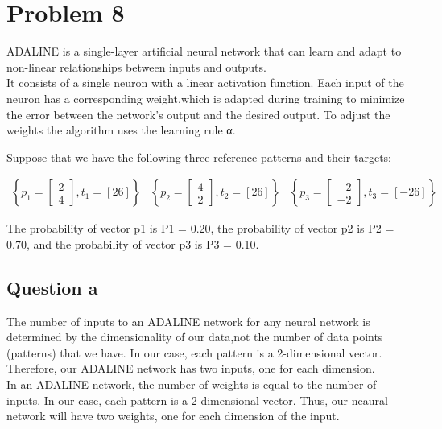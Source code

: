 
\section{Problem 8}
ADALINE is a single-layer artificial neural network that can learn and adapt to non-linear relationships between inputs and outputs. \\
It consists of a single neuron with a linear activation function. Each input of the neuron has a corresponding weight,which is adapted during training to minimize the error between the network's output and the desired output. To adjust the weights the algorithm uses the learning rule α.
\vspace{0.3cm}

Suppose that we have the following three reference patterns and their targets:
\vspace{5mm}

\[
\begin{array}{ccc}
	\left\{ 
	p_1 = \left[
	\begin{array}{c}
		2 \\
		4
	\end{array}
	\right], t_1 = \left[26\right]
	\right\} & 
	\left\{ 
	p_2 = \left[
	\begin{array}{c}
		4 \\
		2
	\end{array}
	\right], t_2 = \left[26\right]
	\right\}
	&\left\{ 
	p_3 = \left[
	\begin{array}{c}
		-2 \\
		-2
	\end{array}
	\right], t_3 = \left[-26\right]
	\right\}
	
\end{array}
\]

\vspace{5mm}

The probability of vector p1 is P1 = 0.20, the probability of vector p2 is P2 = 0.70, and the probability of vector p3 is P3 = 0.10.\\

\subsection{Question a}
The number of inputs to an ADALINE network for any neural network is determined by the dimensionality of our data,not the number of data points (patterns) that we have. In our case, each pattern is a 2-dimensional vector. Therefore, our ADALINE network has two inputs, one for each dimension.\\
In an ADALINE network, the number of weights is equal to the number of inputs. In our case, each pattern is a 2-dimensional vector. Thus, our neaural network will have two weights, one for each dimension of the input.


	

